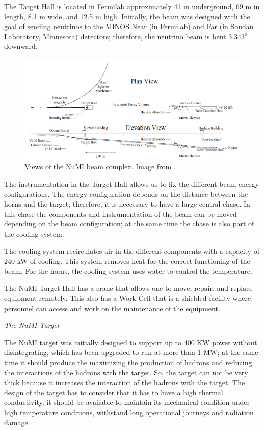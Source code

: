 The Target Hall is located in Fermilab approximately 41 m underground, 69 m in length, 8.1 m wide, and 12.5 m high. Initially, the beam was designed with the goal of sending neutrinos to the MINOS Near (in Fermilab) and Far (in Soudan Laboratory, Minnesota) detectors; therefore, the neutrino beam is bent $3.343^o$ downward.  

\begin{figure}[!htb]
\centering
\includegraphics[scale=0.4]{Figures/Chapter2/NuMIFacilityViews.png}
        \caption{Views of the NuMI beam complex. Image from \cite{Numi}.} 
\label{fig:MnvExp:NuMI:NuMIviews}
\end{figure}

The instrumentation in the Target Hall allows us to fix the different beam-energy configurations. The energy configuration depends on the distance between the horns and the target; therefore, it is necessary to have a large central chase. In this chase the components and instrumentation of the beam can be moved depending on the beam configuration; at the same time the chase is also part of the cooling system. 

The cooling system recirculates air in the different components with a capacity of 240 kW of cooling. This system removes heat for the correct functioning of the beam. For the horns, the cooling system uses water to control the temperature.

The NuMI Target Hall has a crane that allows one to move, repair, and replace equipment remotely. This also has a Work Cell that is a shielded facility where personnel can access and work on the maintenance of the equipment. 

\textit{The NuMI Target}

The NuMI target was initially designed to support up to 400 KW power without disintegrating, which has been upgraded to run at more than 1 MW; at the same time it should produce the maximizing the production of hadrons and reducing the interactions of the hadrons with the target. So, the target can not be very thick because it increases the interaction of the hadrons with the target. The design of the target has to consider that it has to have a high thermal conductivity, it should be available to maintain its mechanical condition under high temperature conditions, withstand long operational journeys and radiation damage. 

